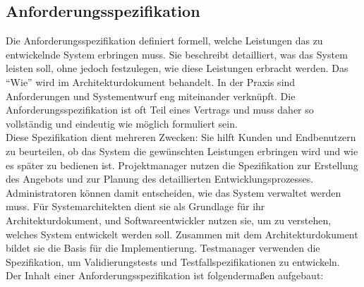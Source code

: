 \subsection{Anforderungsspezifikation}  \label{Anforderungsspezifikation}

Die Anforderungsspezifikation definiert formell, welche Leistungen das zu entwickelnde System erbringen muss. Sie 
beschreibt detailliert, was das System leisten soll, ohne jedoch festzulegen, wie diese Leistungen erbracht werden. 
Das ``Wie'' wird im Architekturdokument behandelt. In der Praxis sind Anforderungen und Systementwurf eng miteinander 
verknüpft. Die Anforderungsspezifikation ist oft Teil eines Vertrags und muss daher so vollständig und eindeutig wie 
möglich formuliert sein.\\

Diese Spezifikation dient mehreren Zwecken: Sie hilft Kunden und Endbenutzern zu beurteilen, ob das System die 
gewünschten Leistungen erbringen wird und wie es später zu bedienen ist. Projektmanager nutzen die Spezifikation 
zur Erstellung des Angebots und zur Planung des detaillierten Entwicklungsprozesses. Administratoren können damit 
entscheiden, wie das System verwaltet werden muss. Für Systemarchitekten dient sie als Grundlage für ihr 
Architekturdokument, und Softwareentwickler nutzen sie, um zu verstehen, welches System entwickelt werden soll. 
Zusammen mit dem Architekturdokument bildet sie die Basis für die Implementierung. Testmanager verwenden die 
Spezifikation, um Validierungstests und Testfallspezifikationen zu entwickeln.\\

Der Inhalt einer Anforderungsspezifikation ist folgendermaßen aufgebaut:

